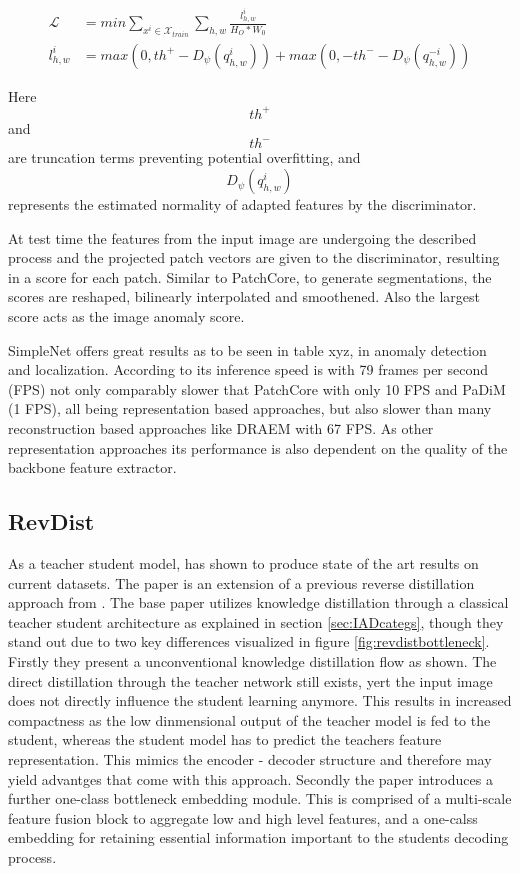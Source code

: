 \begin{equation}
    \label{eq:simplenetloss}
    \begin{split}
        \mathcal{L} &= min \sum_{x^{i}\in \mathcal{X}_{train}} \sum_{h, w} \frac{l^{i}_{h,w}}{H_{O} * W_{0}} \\
        l^{i}_{h,w} &= max(0, th^{+} - D_{\psi}(q^{i}_{h,w})) + max(0, -th^{-} - D_{\psi}(q^{-i}_{h,w}))
    \end{split}
\end{equation}    

Here $$th^{+}$$ and $$th^{-}$$ are truncation terms preventing potential overfitting, and $$D_{\psi}(q^{i}_{h,w})$$ represents the estimated normality of adapted features by the discriminator.

At test time the features from the input image are undergoing the described process and the projected patch vectors are given to the discriminator, resulting in a score for each patch. Similar to 
PatchCore, to generate segmentations, the scores are reshaped, bilinearly interpolated and smoothened. Also the largest score acts as the image anomaly score.

SimpleNet offers great results as to be seen in table xyz, in anomaly detection and localization. According to \cite{liu2023simplenet} its inference speed is with 79 frames per second (FPS) 
not only comparably slower that PatchCore \cite{patchCore2022} with only 10 FPS 
and PaDiM \cite{Defard_2021PADIM} (1 FPS), all being representation based approaches, but also slower than many reconstruction based approaches like DRAEM with 67 FPS. As other representation 
approaches its performance is also dependent on the quality of the backbone feature extractor.


\subsection{RevDist}
\label{subsec:revdist}

As a teacher student model, \cite{revdist2023} has shown to produce state of the art results on current datasets. The paper is an extension of a previous reverse distillation approach from 
\cite{Deng_2022basicrevdist}. The base paper utilizes knowledge distillation through a classical teacher student architecture as explained in section \ref{sec:IADcategs}, though they stand out 
due to two key differences visualized in figure \ref{fig:revdistbottleneck}. Firstly they present a unconventional knowledge distillation flow as shown. The direct distillation through the teacher network still exists, 
yert the input image does not directly influence the student learning anymore. This results in increased compactness as the low dinmensional output of the teacher model is fed to the student, 
whereas the student model has to predict the teachers feature representation. This mimics the encoder - decoder structure and therefore may yield advantges that come with this approach. Secondly 
the paper introduces a further one-class bottleneck embedding module. This is comprised of a multi-scale feature fusion block to aggregate low and high level features, and a one-calss embedding 
for retaining essential information important to the students decoding process. 

